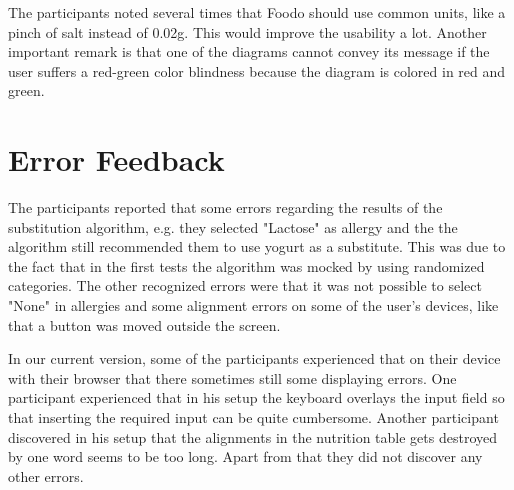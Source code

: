 
The participants noted several times that Foodo should use common units, like a pinch of salt instead of 0.02g. This would improve the usability a lot. Another important remark is that one of the diagrams cannot convey its message if the user suffers a red-green color blindness because the diagram is colored in red and green. 

\section{Error Feedback}


The participants reported that some errors regarding the results of the substitution algorithm, e.g. they selected "Lactose" as allergy and the the algorithm still recommended them to use yogurt as a substitute. This was due to the fact that in the first tests the algorithm was mocked by using randomized categories. The other recognized errors were that it was not possible to select "None" in allergies and some alignment errors on some of the user's devices, like that a button was moved outside the screen.


In our current version, some of the participants experienced that on their  device with their browser that there sometimes still some displaying errors. One participant experienced that in his setup the keyboard overlays the input field so that inserting the required input can be quite cumbersome. Another participant discovered in his setup that the alignments in the nutrition table gets destroyed by one word seems to be too long. Apart from that they did not discover any other errors.


